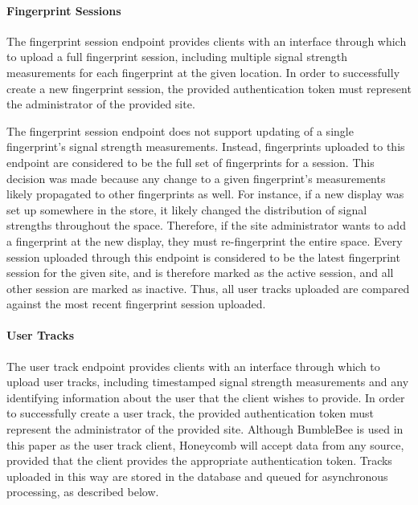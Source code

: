 \paragraph{Fingerprint Sessions}
%

The fingerprint session endpoint provides clients with an interface through which to upload a full fingerprint session, including multiple signal strength measurements for each fingerprint at the given location. In order to successfully create a new fingerprint session, the provided authentication token must represent the administrator of the provided site. 

The fingerprint session endpoint does not support updating of a single fingerprint's signal strength measurements. Instead, fingerprints uploaded to this endpoint are considered to be the full set of fingerprints for a session. This decision was made because any change to a given fingerprint's measurements likely propagated to other fingerprints as well. For instance, if a new display was set up somewhere in the store, it likely changed the distribution of signal strengths throughout the space. Therefore, if the site administrator wants to add a fingerprint at the new display, they must re-fingerprint the entire space. Every session uploaded through this endpoint is considered to be the latest fingerprint session for the given site, and is therefore marked as the active session, and all other session are marked as inactive. Thus, all user tracks uploaded are compared against the most recent fingerprint session uploaded.


\paragraph{User Tracks}
%

The user track endpoint provides clients with an interface through which to upload user tracks, including timestamped signal strength measurements and any identifying information about the user that the client wishes to provide. In order to successfully create a user track, the provided authentication token must represent the administrator of the provided site. Although BumbleBee is used in this paper as the user track client, Honeycomb will accept data from any source, provided that the client provides the appropriate authentication token. Tracks uploaded in this way are stored in the database and queued for asynchronous processing, as described below.

